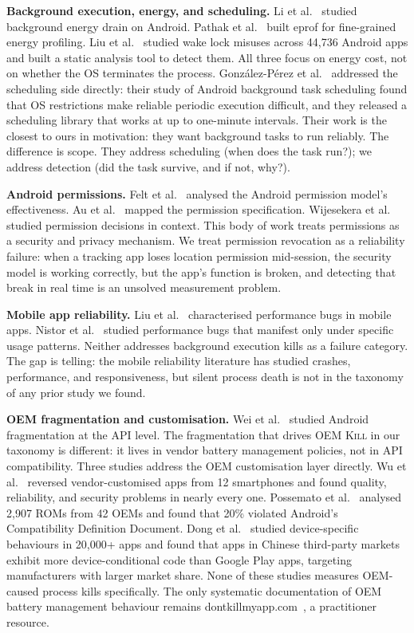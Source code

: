 \documentclass[10pt,journal,compsoc]{IEEEtran}
\begin{document}
\textbf{Background execution, energy, and scheduling.}
Li et al.~\cite{li2014making} studied background energy drain on
Android. Pathak et al.~\cite{pathak2012energy} built eprof for
fine-grained energy profiling. Liu et al.~\cite{liu2016wake} studied
wake lock misuses across 44,736 Android apps and built a static
analysis tool to detect them. All three focus on energy cost, not on
whether the OS terminates the process. Gonz\'{a}lez-P\'{e}rez et
al.~\cite{gonzalez2022reliable} addressed the scheduling side directly:
their study of Android background task scheduling found that OS
restrictions make reliable periodic execution difficult, and they
released a scheduling library that works at up to one-minute intervals.
Their work is the closest to ours in motivation: they want background
tasks to run reliably. The difference is scope. They address scheduling
(when does the task run?); we address detection (did the task survive,
and if not, why?).

\textbf{Android permissions.}
Felt et al.~\cite{felt2012android} analysed the Android permission
model's effectiveness. Au et al.~\cite{au2012pscout} mapped the
permission specification. Wijesekera et
al.~\cite{wijesekera2015android} studied permission decisions in
context. This body of work treats permissions as a security and privacy
mechanism. We treat permission revocation as a reliability failure:
when a tracking app loses location permission mid-session, the security
model is working correctly, but the app's function is broken, and
detecting that break in real time is an unsolved measurement problem.

\textbf{Mobile app reliability.}
Liu et al.~\cite{liu2014characterizing} characterised performance bugs
in mobile apps. Nistor et al.~\cite{nistor2013discovering} studied
performance bugs that manifest only under specific usage patterns.
Neither addresses background execution kills as a failure category.
The gap is telling: the mobile reliability literature has studied
crashes, performance, and responsiveness, but silent process death is
not in the taxonomy of any prior study we found.

\textbf{OEM fragmentation and customisation.}
Wei et al.~\cite{wei2016taming} studied Android fragmentation at the
API level. The fragmentation that drives \textsc{OEM Kill} in our
taxonomy is different: it lives in vendor battery management policies,
not in API compatibility. Three studies address the OEM customisation
layer directly. Wu et al.~\cite{wu2015vendor} reversed vendor-customised
apps from 12 smartphones and found quality, reliability, and security
problems in nearly every one. Possemato et
al.~\cite{possemato2021trust} analysed 2,907 ROMs from 42 OEMs and
found that 20\% violated Android's Compatibility Definition Document.
Dong et al.~\cite{dong2024same} studied device-specific behaviours in
20,000+ apps and found that apps in Chinese third-party markets exhibit
more device-conditional code than Google Play apps, targeting
manufacturers with larger market share. None of these studies measures
OEM-caused process kills specifically. The only systematic
documentation of OEM battery management behaviour remains
dontkillmyapp.com~\cite{dontkillmyapp}, a practitioner resource.
\end{document}

